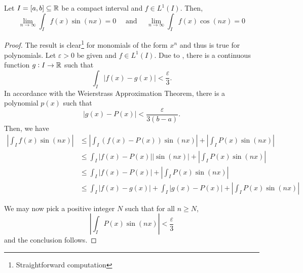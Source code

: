 \begin{theorem}
    Let $I = [a,b]\subseteq\mathbb{R}$ be a compact interval and $f\in L^1(I)$. Then, 
    \begin{equation*}
        \lim_{n\to\infty}\int_I f(x)\sin(nx) = 0\quad\text{ and }\quad\lim_{n\to\infty}\int_I f(x)\cos(nx) = 0
    \end{equation*}
\end{theorem}
\begin{proof}
    The result is clear\footnote{Straightforward computation} for monomials of the form $x^n$ and thus is true for polynomials. Let $\varepsilon > 0$ be given and $f\in L^1(I)$. Due to , there is a continuous function $g: I\to\mathbb{R}$ such that 
    \begin{equation*}
        \int_I|f(x) - g(x)| < \frac{\varepsilon}{3}.
    \end{equation*}
    In accordance with the Weierstrass Approximation Theorem, there is a polynomial $p(x)$ such that 
    \begin{equation*}
        \left|g(x) - P(x)\right| < \frac{\varepsilon}{3(b - a)}.
    \end{equation*}
    Then, we have 
    \begin{align*}
        \left|\int_I f(x)\sin(nx)\right| &\le\left|\int_I(f(x) - P(x))\sin(nx)\right| + \left|\int_I P(x)\sin(nx)\right|\\
        &\le\int_I |f(x) - P(x)||\sin(nx)| + \left|\int_I P(x)\sin(nx)\right|\\
        &\le\int_I|f(x) - P(x)| + \left|\int_I P(x)\sin(nx)\right|\\
        &\le\int_I|f(x) - g(x)| + \int_I|g(x) - P(x)| + \left|\int_I P(x)\sin(nx)\right|
    \end{align*}

    We may now pick a positive integer $N$ such that for all $n\ge N$, 
    \begin{equation*}
        \left|\int_I P(x)\sin(nx)\right| < \frac{\varepsilon}{3}
    \end{equation*}
    and the conclusion follows.
\end{proof}
